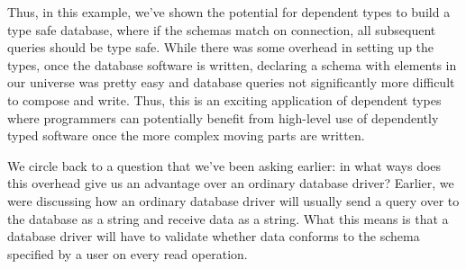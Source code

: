 Thus, in this example, we've shown the potential for dependent types to build a
type safe database, where if the schemas match on connection, all subsequent
queries should be type safe. While there was some overhead in setting up the
types, once the database software is written, declaring a schema with elements
in our universe was pretty easy and database queries not significantly more
difficult to compose and write. Thus, this is an exciting application of
dependent types where programmers can potentially benefit from high-level use of
dependently typed software once the more complex moving parts are written. 

We circle back to a question that we've been asking earlier: in what ways does
this overhead give us an advantage over an ordinary database driver? Earlier, we
were discussing how an ordinary database driver will usually send a query over
to the database as a string and receive data as a string. What this means is
that a database driver will have to validate whether data conforms to the schema
specified by a user on every read operation. 



